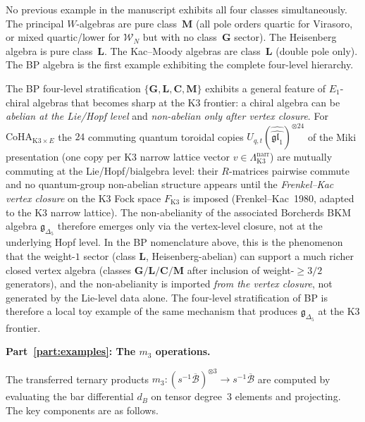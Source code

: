 \begin{computation}[The ordered bar complex of the
Bershadsky--Polyakov algebra
$\mathcal{B}^{k'} = W_{k'}(\mathfrak{sl}_3,f_{\min})$;
\ClaimStatusProvedHere]
\begin{remark}
No previous example in the manuscript exhibits
all four classes simultaneously. The principal $W$-algebras
are pure class~$\mathbf{M}$ (all pole orders quartic
for Virasoro, or mixed quartic/lower for $\mathcal{W}_N$ but
with no class~$\mathbf{G}$ sector). The Heisenberg algebra
is pure class~$\mathbf{L}$. The Kac--Moody algebras are
class~$\mathbf{L}$ (double pole only). The BP algebra is
the first example exhibiting the complete four-level hierarchy.
\end{remark}

\begin{remark}
\label{rem:oackd-front-abelian-lie-nonabelian-vertex}
%
%
%
The BP four-level stratification $\{\mathbf{G}, \mathbf{L},
\mathbf{C}, \mathbf{M}\}$ exhibits a general feature of
$E_1$-chiral algebras that becomes sharp at the K3 frontier:
a chiral algebra can be \emph{abelian at the Lie/Hopf level}
and \emph{non-abelian only after vertex closure}. For
$\mathrm{CoHA}_{\mathrm{K3}\times E}$ the $24$ commuting
quantum toroidal copies $U_{q,t}(\widehat{\widehat{\mathfrak{gl}_1}})^{\otimes 24}$
of the Miki presentation (one copy per K3 narrow lattice
vector $v \in \Lambda_{\mathrm{K3}}^{\mathrm{narr}}$) are
mutually commuting at the Lie/Hopf/bialgebra level: their
$R$-matrices pairwise commute and no quantum-group non-abelian
structure appears until the \emph{Frenkel--Kac vertex
closure} on the K3 Fock space $F_{\mathrm{K3}}$ is imposed
(Frenkel--Kac~1980, adapted to the K3 narrow lattice). The
non-abelianity of the associated Borcherds BKM algebra
$\mathfrak{g}_{\Delta_5}$ therefore emerges only via the
vertex-level closure, not at the underlying Hopf level. In
the BP nomenclature above, this is the phenomenon that the
weight-$1$ sector (class $\mathbf{L}$, Heisenberg-abelian)
can support a much richer closed vertex algebra (classes
$\mathbf{G/L/C/M}$ after inclusion of weight-$\geq 3/2$
generators), and the non-abelianity is imported \emph{from the
vertex closure}, not generated by the Lie-level data alone.
The four-level stratification of BP is therefore a local
toy example of the same mechanism that produces
$\mathfrak{g}_{\Delta_5}$ at the K3 frontier.
\end{remark}

\medskip
\noindent\textbf{Part~\ref{part:examples}: The $m_3$ operations.}

The transferred ternary products
$m_3\colon (s^{-1}\overline{\mathcal{B}})^{\otimes 3}
\to s^{-1}\overline{\mathcal{B}}$ are computed by
evaluating the bar differential $d_B$ on tensor degree~$3$
elements and projecting. The key components are as follows.


\end{computation}
